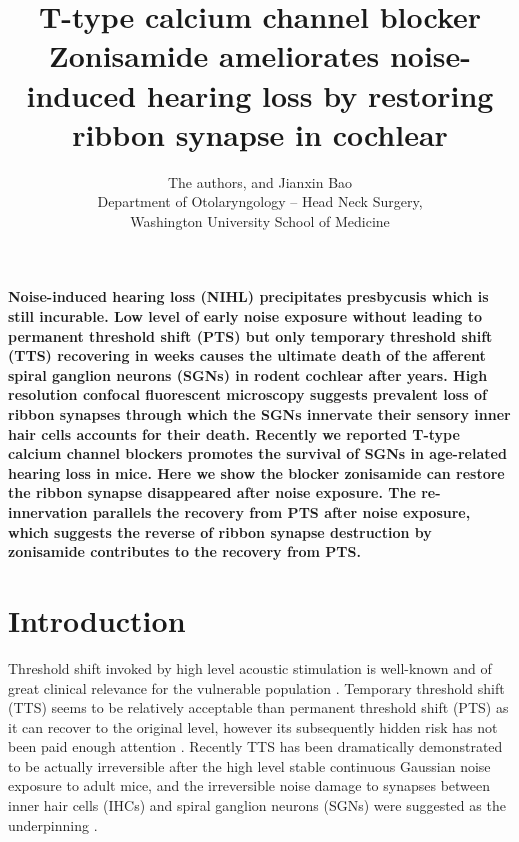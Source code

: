 \documentclass[11pt]{article}
\begin{document}




\title{T-type calcium channel blocker Zonisamide ameliorates noise-induced hearing loss by restoring ribbon synapse in cochlear}
\author{The authors, and Jianxin Bao \\ Department of Otolaryngology -- Head Neck Surgery,\\ Washington University School of Medicine}
\maketitle
{\bf {Noise-induced hearing loss (NIHL) precipitates presbycusis which is still incurable. Low level of early noise exposure without leading to permanent threshold shift (PTS) but only temporary threshold shift (TTS) recovering in weeks causes the ultimate death of the afferent spiral ganglion neurons (SGNs) in rodent cochlear after years. High resolution confocal fluorescent microscopy suggests prevalent loss of ribbon synapses through which the SGNs innervate their sensory inner hair cells accounts for their death. Recently we reported T-type calcium channel blockers promotes the survival of SGNs in age-related hearing loss in mice. Here we show the blocker zonisamide can restore the ribbon synapse disappeared after noise exposure. The re-innervation parallels the recovery from PTS after noise exposure, which suggests the reverse of ribbon synapse destruction by zonisamide contributes to the recovery from PTS. }}

\section {Introduction}
Threshold shift invoked by high level acoustic stimulation is well-known and of great clinical relevance for the vulnerable population \cite{Mahboubi2012}. Temporary threshold shift (TTS) seems to be relatively acceptable than permanent threshold shift (PTS) as it can recover to the original level, however its subsequently hidden risk has not been paid enough attention \cite{Melnick1991}. Recently TTS has been dramatically demonstrated to be actually irreversible after the high level stable continuous Gaussian noise exposure to adult mice, and the irreversible noise damage to synapses between inner hair cells (IHCs) and spiral ganglion neurons (SGNs) were suggested as the underpinning \cite{Kujawa2009}. 
\end{document}
